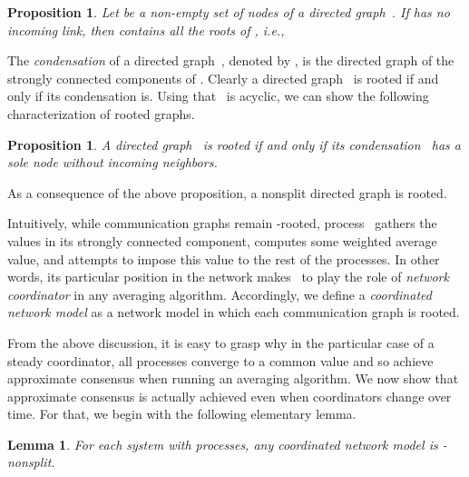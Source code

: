 \documentclass[a4paper]{article}
\theoremstyle{newthm}
\newtheorem{prop}[thm]{Proposition}
\newtheorem{lem}[thm]{Lemma}
\begin{document}
\begin{prop}\label{prop:rooted}
Let    be a non-empty set of nodes of a directed graph~.
If  has no incoming link, then  contains all the roots of , i.e., 
	
\end{prop}

The {\em condensation\/} of a directed graph~, denoted by , is the directed graph of 
	the strongly connected components of .
Clearly a directed graph~ is rooted if and only if its condensation  is.
Using that~  is acyclic, we  can show the following characterization of rooted graphs.
 
\begin{prop}\label{prop:rootedbis}
A directed graph~ is rooted if and only if its condensation~ has a sole node without
        incoming neighbors.
\end{prop}
\noindent As a consequence of the above proposition, a nonsplit directed graph is rooted.




\medskip
Intuitively, while communication graphs remain -rooted, process~ gathers the 
	values in its strongly connected component, computes  some weighted average value,
	and attempts to impose this value to the rest of the processes.
In other words, its particular position in the network makes~ 
	to play the role of {\em network coordinator\/} in  any averaging algorithm.
Accordingly, we define a {\em coordinated network model\/} as a network model 
	in which each communication graph is rooted.

From the above discussion, it is easy to grasp why in the particular 
	case of a steady coordinator, all processes converge to a common value and so achieve approximate 
	consensus when running an averaging algorithm.
We now  show that approximate consensus is actually achieved even when coordinators
	change over time. 
For that, we begin with the following elementary lemma.

\begin{lem}\label{lem:productrooted}
For each system with  processes, any coordinated network model  is -nonsplit.
\end{lem}
\end{document}

